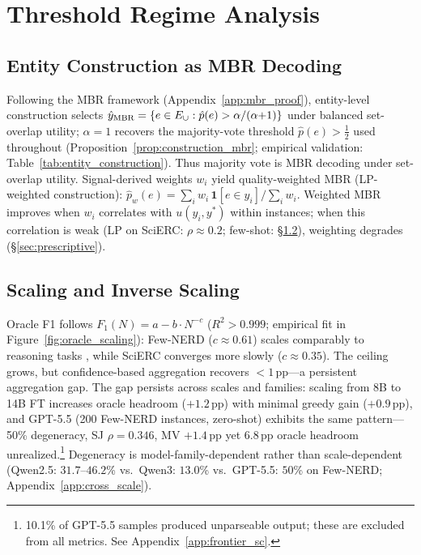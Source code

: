 \section{Threshold Regime Analysis}\label{sec:theory_scaling}

\subsection{Entity Construction as MBR Decoding}\label{sec:mbr_theory}

Following the MBR framework (Appendix~\ref{app:mbr_proof}), entity-level construction selects $\hat{y}_{\textup{MBR}} = \{e \in E_\cup : \hat{p}(e) > \alpha/(\alpha{+}1)\}$ under balanced set-overlap utility; $\alpha{=}1$ recovers the majority-vote threshold $\hat{p}(e) > \tfrac{1}{2}$ used throughout (Proposition~\ref{prop:construction_mbr}; empirical validation: Table~\ref{tab:entity_construction}).
Thus majority vote is MBR decoding under set-overlap utility.
Signal-derived weights $w_i$ yield quality-weighted MBR (LP-weighted construction): $\hat{p}_w(e) = \sum_{i} w_i \, \mathbf{1}[e {\in} y_i] / \sum_{i} w_i$.
Weighted MBR improves when $w_i$ correlates with $u(y_i, y^*)$ within instances; when this correlation is weak (LP on SciERC: $\rho{\approx}0.2$; few-shot: \S\ref{sec:scaling}), weighting degrades (\S\ref{sec:prescriptive}).

\subsection{Scaling and Inverse Scaling}\label{sec:scaling}

Oracle F1 follows $F_1(N) = a - b \cdot N^{-c}$ ($R^2 > 0.999$; empirical fit in Figure~\ref{fig:oracle_scaling}): Few-NERD ($c{\approx}0.61$) scales comparably to reasoning tasks \cite{brown2024monkeys}, while SciERC converges more slowly ($c{\approx}0.35$).
The ceiling grows, but confidence-based aggregation recovers ${<}1$\,pp---a persistent aggregation gap.
The gap persists across scales and families: scaling from 8B to 14B FT increases oracle headroom ($+1.2$\,pp) with minimal greedy gain ($+0.9$\,pp), and GPT-5.5 (200 Few-NERD instances, zero-shot) exhibits the same pattern---50\% degeneracy, SJ $\rho{=}0.346$, MV $+1.4$\,pp yet 6.8\,pp oracle headroom unrealized.\footnote{10.1\% of GPT-5.5 samples produced unparseable output; these are excluded from all metrics. See Appendix~\ref{app:frontier_sc}.}
Degeneracy is model-family-dependent rather than scale-dependent (Qwen2.5: $31.7$--$46.2$\% vs.\ Qwen3: $13.0$\% vs.\ GPT-5.5: $50$\% on Few-NERD; Appendix~\ref{app:cross_scale}).

